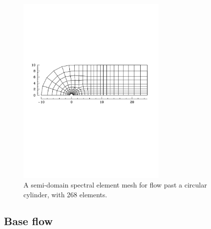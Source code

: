 \documentclass[11pt,a4paper]{report}
\begin{document}
\begin{figure}
\begin{center}
\includegraphics[width=0.65\textwidth]{semicyl02mesh.pdf}
\end{center}
\caption{A semi-domain spectral element mesh for flow past a circular
  cylinder, with 268 elements.}
\label{fig.semicylmesh}
\end{figure}

\subsection{Base flow}
\end{document}
